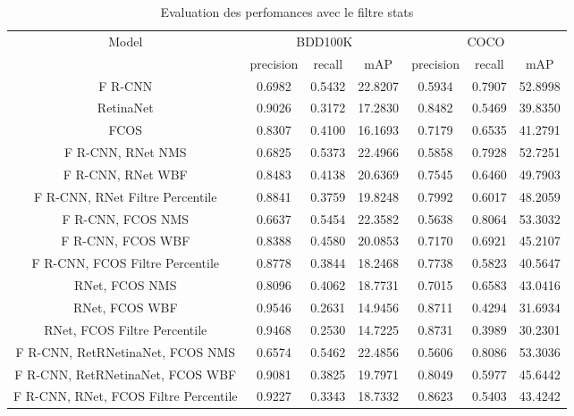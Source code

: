 \documentclass{article}
\begin{document}
\begin{table}[h!]
\centering
\begin{tabular}{|c||c|c|c||c|c|c|} 
\hline
Model & \multicolumn{3}{|c||}{BDD100K} & \multicolumn{3}{|c|}{COCO} \\ 
 & precision & recall & mAP  & precision & recall & mAP  \\ [0.5ex] 
\hline
F R-CNN & 0.6982 & 0.5432 & 22.8207 & 0.5934 & 0.7907 & 52.8998 \\ 
\hline
RetinaNet & 0.9026 & 0.3172 & 17.2830 & 0.8482 & 0.5469 & 39.8350 \\ 
\hline
FCOS & 0.8307 & 0.4100 & 16.1693 & 0.7179 & 0.6535 & 41.2791 \\ 
\hline
F R-CNN, RNet NMS & 0.6825 & 0.5373 & 22.4966 & 0.5858 & 0.7928 & 52.7251 \\ 
\hline
F R-CNN, RNet WBF & 0.8483 & 0.4138 & 20.6369 & 0.7545 & 0.6460 & 49.7903 \\ 
\hline
F R-CNN, RNet Filtre Percentile & 0.8841 & 0.3759 & 19.8248 & 0.7992 & 0.6017 & 48.2059 \\ 
\hline
F R-CNN, FCOS NMS & 0.6637 & 0.5454 & 22.3582 & 0.5638 & 0.8064 & 53.3032 \\ 
\hline
F R-CNN, FCOS WBF & 0.8388 & 0.4580 & 20.0853 & 0.7170 & 0.6921 & 45.2107 \\ 
\hline
F R-CNN, FCOS Filtre Percentile & 0.8778 & 0.3844 & 18.2468 & 0.7738 & 0.5823 & 40.5647 \\ 
\hline
RNet, FCOS NMS & 0.8096 & 0.4062 & 18.7731 & 0.7015 & 0.6583 & 43.0416 \\ 
\hline
RNet, FCOS WBF & 0.9546 & 0.2631 & 14.9456 & 0.8711 & 0.4294 & 31.6934 \\ 
\hline
RNet, FCOS Filtre Percentile & 0.9468 & 0.2530 & 14.7225 & 0.8731 & 0.3989 & 30.2301 \\ 
\hline
F R-CNN, RetRNetinaNet, FCOS NMS & 0.6574 & 0.5462 & 22.4856 & 0.5606 & 0.8086 & 53.3036 \\ 
\hline
F R-CNN, RetRNetinaNet, FCOS WBF & 0.9081 & 0.3825 & 19.7971 & 0.8049 & 0.5977 & 45.6442 \\ 
\hline
F R-CNN, RNet, FCOS Filtre Percentile & 0.9227 & 0.3343 & 18.7332 & 0.8623 & 0.5403 & 43.4242 \\ 
\hline
\end{tabular}
\caption{Evaluation des perfomances avec le filtre stats}
\label{table:data}
\end{table}
\end{document}
